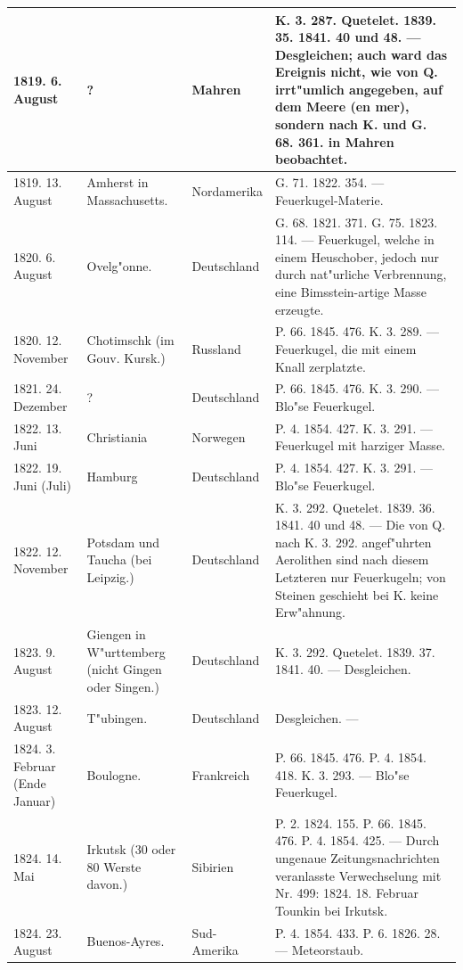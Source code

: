\documentclass[a4paper, 8pt, oneside, polutonikogreek, german]{article}
\begin{document}
\begin{center}
\begin{longtable}{| p{20mm} | p{25mm} | p{20mm} | p{55mm} |}
        1819. 6. August & ? & Mahren & K. 3. 287. Quetelet. 1839. 35. 1841. 40 und 48. --- Desgleichen; auch ward das Ereignis nicht, wie von Q. irrt"umlich angegeben, auf dem Meere (en mer), sondern nach K. und G. 68. 361. in Mahren beobachtet. \\ \hline
        1819. 13. August & Amherst in Massachusetts. & Nordamerika & G. 71. 1822. 354. --- Feuerkugel-Materie. \\ \hline
        1820. 6. August & Ovelg"onne. & Deutschland & G. 68. 1821. 371. G. 75. 1823. 114. --- Feuerkugel, welche in einem Heuschober, jedoch nur durch nat"urliche Verbrennung, eine Bimsstein-artige Masse erzeugte. \\ \hline
        1820. 12. November & Chotimschk (im Gouv. Kursk.) & Russland & P. 66. 1845. 476. K. 3. 289. --- Feuerkugel, die mit einem Knall zerplatzte. \\ \hline
        1821. 24. Dezember & ? & Deutschland & P. 66. 1845. 476. K. 3. 290. --- Blo"se Feuerkugel. \\ \hline
        1822. 13. Juni & Christiania & Norwegen & P. 4. 1854. 427. K. 3. 291. --- Feuerkugel mit harziger Masse. \\ \hline
        1822. 19. Juni (Juli) & Hamburg & Deutschland & P. 4. 1854. 427. K. 3. 291. --- Blo"se Feuerkugel. \\ \hline
        1822. 12. November & Potsdam und Taucha (bei Leipzig.) & Deutschland & K. 3. 292. Quetelet. 1839. 36. 1841. 40 und 48. --- Die von Q. nach K. 3. 292. angef"uhrten Aerolithen sind nach diesem Letzteren nur Feuerkugeln; von Steinen geschieht bei K. keine Erw"ahnung. \\ \hline
        1823. 9. August & Giengen in W"urttemberg (nicht Gingen oder Singen.) & Deutschland & K. 3. 292. Quetelet. 1839. 37. 1841. 40. --- Desgleichen. \\ \hline
        1823. 12. August & T"ubingen. & Deutschland & Desgleichen. --- \\ \hline
        1824. 3. Februar (Ende Januar) & Boulogne. & Frankreich & P. 66. 1845. 476. P. 4. 1854. 418. K. 3. 293. --- Blo"se Feuerkugel. \\ \hline
        1824. 14. Mai & Irkutsk (30 oder 80 Werste davon.) & Sibirien & P. 2. 1824. 155. P. 66. 1845. 476. P. 4. 1854. 425. --- Durch ungenaue Zeitungsnachrichten veranlasste Verwechselung mit Nr. 499: 1824. 18. Februar Tounkin bei Irkutsk. \\ \hline
        1824. 23. August & Buenos-Ayres. & Sud-Amerika & P. 4. 1854. 433. P. 6. 1826. 28. --- Meteorstaub. \\ \hline

\end{longtable}
\end{center}
\end{document}
